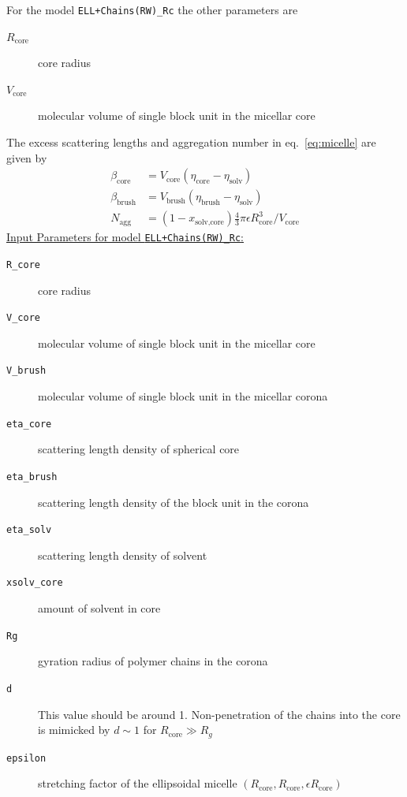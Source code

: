 \noindent
For the model \texttt{ELL+Chains(RW)\_Rc} the other parameters are
\begin{description}
\item[$R_\text{core}$] core radius
\item[$V_\text{core}$] molecular volume of single block unit in the micellar core
\end{description}
The excess scattering lengths and aggregation number in eq.\
\ref{eq:micelle} are given by
\begin{align}
\beta_\text{core}  &= V_\text{core}  (\eta_\text{core} -\eta_\text{solv}) \\
\beta_\text{brush} &= V_\text{brush} (\eta_\text{brush}-\eta_\text{solv}) \\
N_\text{agg} &= (1-x_\text{solv,core}) \frac{4}{3}\pi \epsilon R_\text{core}^3  / V_\text{core}
\end{align}
\uline{Input Parameters for model \texttt{ELL+Chains(RW)\_Rc}:}
\begin{description}
\item[\texttt{R\_core}] core radius
\item[\texttt{V\_core}] molecular volume of single block unit in the micellar core
\item[\texttt{V\_brush}]  molecular volume of single block unit in the micellar corona
\item[\texttt{eta\_core}] scattering length density of spherical core
\item[\texttt{eta\_brush}] scattering length density of the block unit in the corona
\item[\texttt{eta\_solv}] scattering length density of solvent
\item[\texttt{xsolv\_core}] amount of solvent in core
\item[\texttt{Rg}] gyration radius of polymer chains in the corona
\item[\texttt{d}] This value should be around 1. Non-penetration of the chains
into the core is mimicked by $d\sim 1$ for $R_\text{core}\gg R_g$
\item[\texttt{epsilon}] stretching factor of the ellipsoidal micelle
$(R_\text{core},R_\text{core},\epsilon R_\text{core})$
\end{description}

\vspace{5mm}

